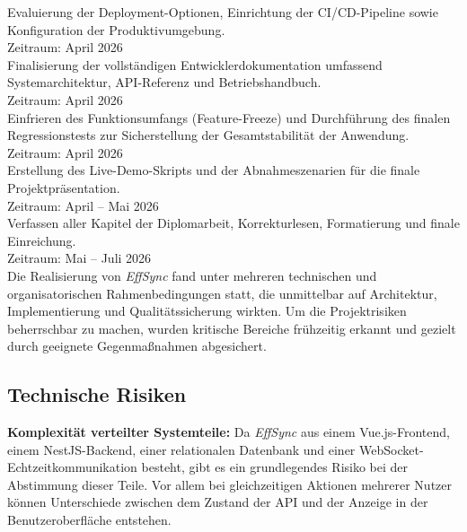 Evaluierung der Deployment-Optionen, Einrichtung der CI/CD-Pipeline sowie Konfiguration
der Produktivumgebung.\\
Zeitraum: April 2026\\
 
Finalisierung der vollständigen Entwicklerdokumentation umfassend Systemarchitektur,
API-Referenz und Betriebshandbuch.\\
Zeitraum: April 2026\\
 
Einfrieren des Funktionsumfangs (Feature-Freeze) und Durchführung des finalen Regressionstests
zur Sicherstellung der Gesamtstabilität der Anwendung.\\
Zeitraum: April 2026\\
 
Erstellung des Live-Demo-Skripts und der Abnahmeszenarien für die finale Projektpräsentation.\\
Zeitraum: April -- Mai 2026\\
 
Verfassen aller Kapitel der Diplomarbeit, Korrekturlesen, Formatierung und finale Einreichung.\\
Zeitraum: Mai -- Juli 2026\\
 
Die Realisierung von \textit{EffSync} fand unter mehreren technischen und organisatorischen Rahmenbedingungen statt, die unmittelbar auf Architektur, Implementierung und Qualitätssicherung wirkten. Um die Projektrisiken beherrschbar zu machen, wurden kritische Bereiche frühzeitig erkannt und gezielt durch geeignete Gegenmaßnahmen abgesichert.
 
\subsection{Technische Risiken}
\textbf{Komplexität verteilter Systemteile:}
Da \textit{EffSync} aus einem Vue.js-Frontend, einem NestJS-Backend, einer relationalen Datenbank und einer WebSocket-Echtzeitkommunikation besteht, gibt es ein grundlegendes Risiko bei der Abstimmung dieser Teile. Vor allem bei gleichzeitigen Aktionen mehrerer Nutzer können Unterschiede zwischen dem Zustand der API und der Anzeige in der Benutzeroberfläche entstehen.
 
